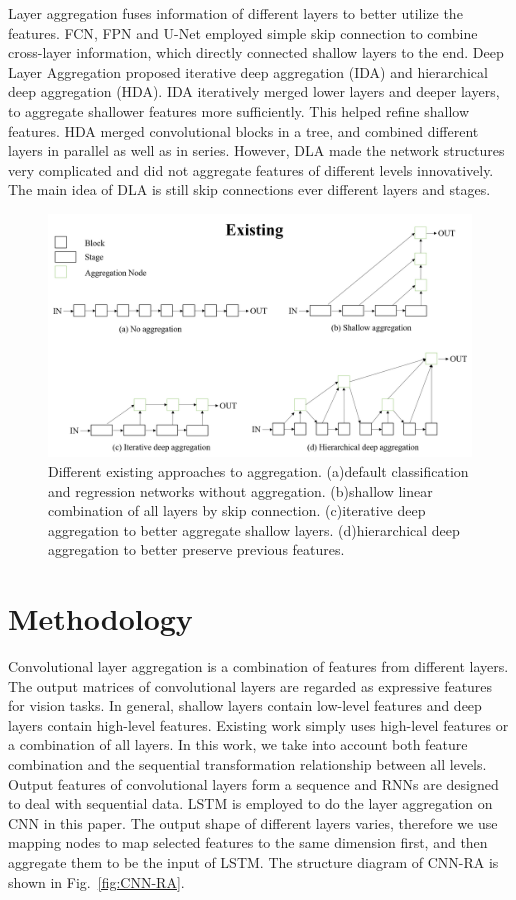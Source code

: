 \documentclass[conference]{IEEEtran}
\begin{document}
Layer aggregation fuses information of different layers to better utilize the features. FCN\cite{FCN}, FPN\cite{FPN} and U-Net\cite{U-Net} employed simple skip connection to combine cross-layer information, which directly connected shallow layers to the end. Deep Layer Aggregation\cite{dla} proposed iterative deep aggregation (IDA) and hierarchical deep aggregation (HDA). IDA iteratively merged lower layers and deeper layers, to aggregate shallower features more sufficiently. This  helped refine shallow features. HDA merged convolutional blocks in a tree, and combined different layers in parallel as well as in series. However, DLA made the network structures very complicated and did not aggregate features of different levels innovatively. The main idea of DLA is still skip connections ever different layers and stages.
\begin{figure}  
	\centering
	\includegraphics[width=13cm]{Figures/existed_aggr.png}
	\caption{Different existing approaches to aggregation. (a)default classification and regression networks without aggregation. (b)shallow linear combination of all layers by skip connection. (c)iterative deep aggregation to better aggregate shallow layers. (d)hierarchical deep aggregation to better preserve previous features.}
	\label{fig:exited_aggr}
\end{figure}

\section{Methodology}
Convolutional layer aggregation is a combination of features from different layers. The output matrices of convolutional layers are regarded as expressive features for vision tasks. In general, shallow layers contain low-level features and deep layers contain high-level features. Existing work simply uses high-level features or a combination of all layers. In this work, we take into account both feature combination and the sequential transformation relationship between all levels. Output features of convolutional layers form a sequence and RNNs are designed to deal with sequential data. LSTM is employed to do the layer aggregation on CNN in this paper. The output shape of different layers varies, therefore we use mapping nodes to map selected features to the same dimension first, and then aggregate them to be the input of LSTM. The structure diagram of CNN-RA is shown in Fig.~\ref{fig:CNN-RA}.
\end{document}
